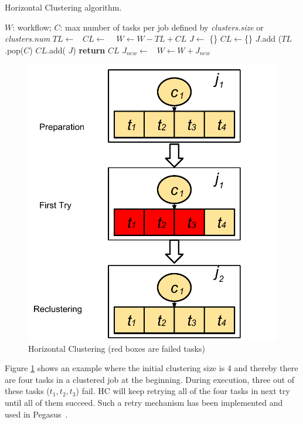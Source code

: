 \begin{algorithm}[!htb]
	\footnotesize
	\caption{Horizontal Clustering algorithm.}
	\label{alg:evaluation_hc}
	\begin{algorithmic}[1]
		\Require $W$: workflow; $C$: max number of tasks per job defined by \emph{clusters.size} or \emph{clusters.num}
				\State $TL\gets $\  
				\State $CL\gets$  \  
				\State $W \gets W - TL + CL$   
			\EndFor
		\EndProcedure
			\State $J\gets$ \{\}
			\State $CL\gets$\{\}
				\State $J$.add ($TL$.pop($C$) 
				\State  $CL$.add( $J$)
			\EndWhile
			\State \textbf{return} $CL$
		\EndProcedure
			\State $J_{new}\gets$\  
			\State $W \gets W + J_{new}$ 
		\EndProcedure
	\end{algorithmic}
\end{algorithm}


\begin{figure}[!htb]
\centering
  \includegraphics[width=0.4\linewidth]{figures/tolerance/hcr.pdf}
  \caption{Horizontal Clustering (red boxes are failed tasks)}
  \label{fig:clustering_hc}
\end{figure}

Figure \ref{fig:clustering_hc} shows an example where the initial clustering size is 4 and thereby there are four tasks in a clustered job at the beginning. During execution, three out of these tasks ($t_1, t_2, t_3$) fail. HC will keep retrying all of the four tasks in next try until all of them succeed. Such a retry mechanism has been implemented and used in Pegasus~\cite{Singh2008}.




